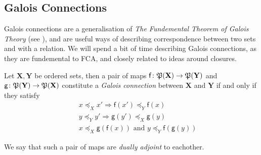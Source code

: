 \subsection{Galois Connections}
\label{subsection:galois-connections}

Galois connections are a generalisation of \textit{The Fundemental Theorem of Galois Theory} (see \cite[pp. 205]{bergman2015invitation}), and are useful ways of describing correspondence between two sets and with a relation. We will spend a bit of time describing Galois connections, as they are fundemental to FCA, and closely related to ideas around closures.

\begin{definition}
\label{definition:Galois-connection-1}
Let $\mathbf{X}, \mathbf{Y}$ be ordered sets, then a pair of maps $\mathsf{f} \colon \mathfrak{P}({\mathbf{X}}) \to \mathfrak{P}({\mathbf{Y}})$ and $\mathsf{g} \colon \mathfrak{P}({\mathbf{Y}}) \to \mathfrak{P}({\mathbf{X}})$ constitute a \emph{Galois connection} between $\mathbf{X}$ and $\mathbf{Y}$ if and only if they satisfy
\begin{align}
    \quad & x \preceq_X x' \Rightarrow \mathsf{f}(x') \preceq_Y \mathsf{f}(x) \label{equation:ord_galois-1} \\
    \quad & y \preceq_Y y' \Rightarrow \mathsf{g}(y') \preceq_X \mathsf{g}(y) \label{equation:ord-galois-2} \\
    \quad & x \preceq_X \mathsf{g}(\mathsf{f}(x)) \text{ and } y \preceq_Y \mathsf{f}(\mathsf{g}(y)) \label{equation:ord-galois-3}
 \end{align}

 We say that such a pair of maps are \emph{dually adjoint} to eachother.
\end{definition}

\begin{proposition}
\label{proposition:fundemental-galois}

\end{proposition}

